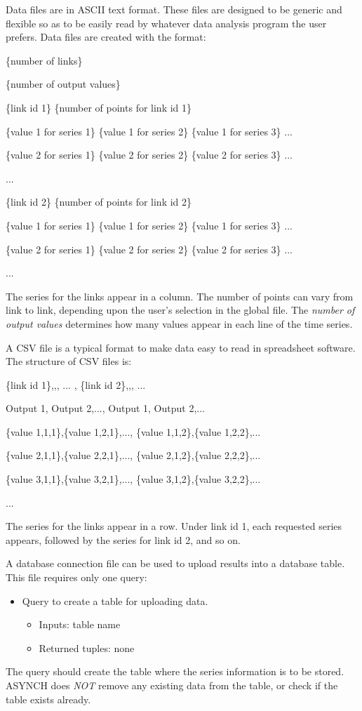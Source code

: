 \documentclass[12pt]{article}
\newenvironment{codeindent}
{\begin{list}{}
        {\setlength{\leftmargin}{.1in}}
        \item[]
}
{\end{list}}
\begin{document}
Data files are in ASCII text format. These files are designed to be generic and flexible so as to be easily read by whatever data analysis program the user prefers. Data files are created with the format:
\begin{codeindent}
 \{number of links\}
 
 \{number of output values\}
 
 \{link id 1\} \{number of points for link id 1\}
 
 \{value 1 for series 1\} \{value 1 for series 2\} \{value 1 for series 3\} ...
 
 \{value 2 for series 1\} \{value 2 for series 2\} \{value 2 for series 3\} ...
 
 ...
 
 \{link id 2\} \{number of points for link id 2\}
 
 \{value 1 for series 1\} \{value 1 for series 2\} \{value 1 for series 3\} ...
 
 \{value 2 for series 1\} \{value 2 for series 2\} \{value 2 for series 3\} ...
 
 ...
\end{codeindent}
The series for the links appear in a column. The number of points can vary from link to link, depending upon the user's selection in the global file. The \emph{number of output values} determines
how many values appear in each line of the time series.

A CSV file is a typical format to make data easy to read in spreadsheet software. The structure of CSV files is:
\begin{codeindent}
 \{link id 1\},,, ... , \{link id 2\},,, ...

 Output 1, Output 2,..., Output 1, Output 2,...
 
 \{value 1,1,1\},\{value 1,2,1\},..., \{value 1,1,2\},\{value 1,2,2\},...
 
 \{value 2,1,1\},\{value 2,2,1\},..., \{value 2,1,2\},\{value 2,2,2\},...
 
 \{value 3,1,1\},\{value 3,2,1\},..., \{value 3,1,2\},\{value 3,2,2\},...
 
 ...
\end{codeindent}
The series for the links appear in a row. Under link id 1, each requested series appears, followed by the series for link id 2, and so on.


A database connection file can be used to upload results into a database table. This file requires only one query:
\begin{itemize}
  \item Query to create a table for uploading data.
  \begin{itemize}
   \item Inputs: table name
   \item Returned tuples: none
  \end{itemize}
\end{itemize}
The query should create the table where the series information is to be stored. ASYNCH does \emph{NOT} remove any existing data from the table, or check if the table exists already.
\end{document}
